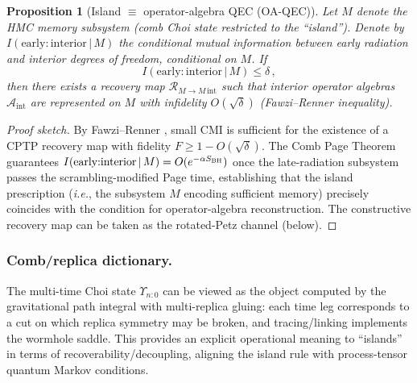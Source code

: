 \documentclass[11pt,a4paper]{article}
\newcommand{\ie}{\textit{i.e.}\xspace}
\newcommand{\HMC}{\textsc{HMC}\xspace}
\theoremstyle{plain}
\newtheorem{proposition}[theorem]{Proposition}
\theoremstyle{definition}
\theoremstyle{remark}
\begin{document}
\begin{proposition}[Island $\equiv$ operator-algebra QEC (OA-QEC)]
\label{prop:island-oa-qec}
Let $M$ denote the \HMC{} memory subsystem (comb Choi state restricted to the ``island''). Denote by $I(\text{early}{:}\text{interior}\,|\,M)$ the conditional mutual information between early radiation and interior degrees of freedom, conditional on $M$.
If 
\[
I(\text{early}{:}\text{interior}\,|\,M)\leq \delta\,,
\]
then there exists a recovery map $\mathcal{R}_{M\to M\,\text{int}}$ such that interior operator algebras $\mathcal{A}_{\text{int}}$ are represented on $M$ with infidelity $O(\sqrt{\delta})$ (Fawzi--Renner inequality).
\end{proposition}
\begin{proof}[Proof sketch]
By Fawzi--Renner \cite{FawziRenner:2015}, small CMI is sufficient for the existence of a CPTP recovery map with fidelity $F\geq 1-O(\sqrt{\delta})$. 
The Comb Page Theorem guarantees $I(\text{early}{:}\text{interior}\,|\,M)=O(e^{-\alpha S_{\rm BH}})$ once the late-radiation subsystem passes the scrambling-modified Page time, establishing that the island prescription (\ie, the subsystem $M$ encoding sufficient memory) precisely coincides with the condition for operator-algebra reconstruction.
The constructive recovery map can be taken as the rotated-Petz channel (below).
\end{proof}

\subsubsection{Comb/replica dictionary.}
The multi-time Choi state $\Upsilon_{n{:}0}$ can be viewed as the object computed by the gravitational path integral with multi-replica gluing:
each time leg corresponds to a cut on which replica symmetry may be broken, and tracing/linking implements the wormhole saddle.
This provides an explicit operational meaning to ``islands'' in terms of recoverability/decoupling, aligning the island rule with process-tensor quantum Markov conditions.
\end{document}
